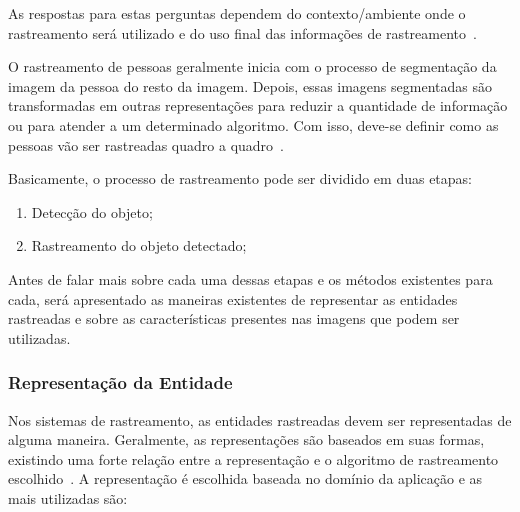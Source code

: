 	As respostas para estas perguntas dependem do contexto/ambiente onde o rastreamento será utilizado e do uso final das informações de rastreamento~\cite{yilmaz}.

	O rastreamento de pessoas geralmente inicia com o processo de segmentação da
	imagem da pessoa do resto da imagem. Depois, essas imagens segmentadas são
	transformadas em outras representações para reduzir a quantidade de informação
	ou para atender a um determinado algoritmo. Com isso, deve-se definir como as
	pessoas vão ser rastreadas quadro a quadro~\cite{moeslund}.

	Basicamente, o processo de rastreamento pode ser dividido em duas etapas:

		\begin{enumerate}
			\item Detecção do objeto;
			\item Rastreamento do objeto detectado;
		\end{enumerate}

	Antes de falar mais sobre cada uma dessas etapas e os métodos existentes para cada, será apresentado as maneiras existentes de representar as entidades rastreadas e sobre as características presentes nas imagens que podem ser utilizadas.


\subsubsection{Representação da Entidade}
\label{sec:representacao-objeto}

	Nos sistemas de rastreamento, as entidades rastreadas devem ser representadas de alguma maneira. Geralmente, as representações são baseados em suas formas, existindo uma forte relação entre a representação e o algoritmo de rastreamento escolhido~\cite{yilmaz}. A representação é escolhida baseada no domínio da aplicação e as mais utilizadas são:

